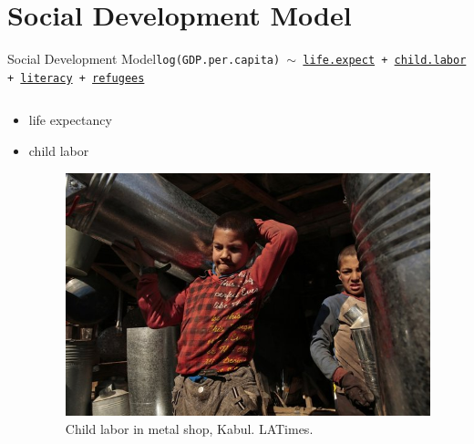 \documentclass{beamer}
\begin{document}
\section{Social Development Model}

\begin{frame}{{\sc Social Development} Model}{\tt log(GDP.per.capita) $\sim$ \href{http://data.worldbank.org/indicator/SP.DYN.LE00.IN}{life.expect} + \href{http://data.worldbank.org/indicator/SL.TLF.0714.ZS}{child.labor} + \href{http://data.worldbank.org/indicator/SE.ADT.LITR.ZS}{literacy} + \href{http://data.worldbank.org/indicator/SM.POP.REFG.OR}{refugees}}
  \begin{columns}
    \begin{column}{0.5\textwidth}
      \begin{itemize}
      \item life expectancy
      \item child labor
        \begin{figure}
	  \centering
	  \includegraphics[scale=0.55]{images/child_labor.jpeg}
	  \caption{Child labor in metal shop, Kabul. LATimes.}
        \end{figure}
      \end{itemize}
    \end{column}
    

\end{columns}
\end{frame}
\end{document}

